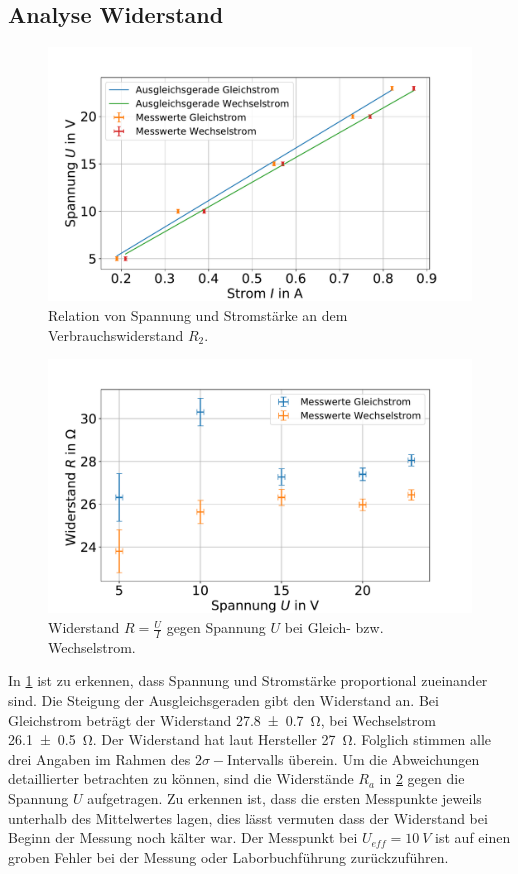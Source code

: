 \subsection{Analyse Widerstand} 



\begin{figure}[h]
	\centering
	\includegraphics[width=0.9\linewidth]{"auswertung/Auswertung Innenwiderstand/Widerstand R2 B"}
	\caption{Relation von Spannung und Stromstärke an dem Verbrauchswiderstand $R_2$.}
	\label{fig:widerstand-r2}
\end{figure}



\begin{figure}[h]
	\centering
	\includegraphics[width=0.9\linewidth]{"auswertung/Auswertung Innenwiderstand/WiderstandR2 A"}
	\caption{Widerstand $R=\frac{U}{I}$ gegen Spannung $U$ bei Gleich- bzw. Wechselstrom.}
	\label{fig:widerstandr2-a}
\end{figure}


In \cref{fig:widerstand-r2} ist zu erkennen, dass Spannung und Stromstärke proportional zueinander sind. Die Steigung der Ausgleichsgeraden gibt den Widerstand an. Bei Gleichstrom beträgt der Widerstand \SI{27.8+-0.7}{\ohm}, bei Wechselstrom \SI{26.1+- 0.5}{\ohm}. Der Widerstand hat laut Hersteller \SI{27}{\ohm}. Folglich stimmen alle drei Angaben im Rahmen des $2\sigma-$Intervalls überein. Um die Abweichungen detaillierter betrachten zu können, sind die Widerstände $R_a$ in \cref{fig:widerstandr2-a} gegen die Spannung $U$ aufgetragen. Zu erkennen ist, dass die ersten Messpunkte jeweils unterhalb des Mittelwertes lagen, dies lässt vermuten dass der Widerstand bei Beginn der Messung noch kälter war. Der Messpunkt bei  $U_{eff}= \SI{10}{V}$ ist auf einen groben Fehler bei der Messung oder Laborbuchführung zurückzuführen.\\


